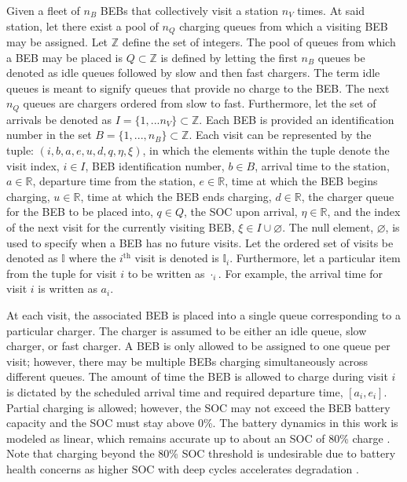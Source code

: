 \documentclass[energies,article,submit,moreauthors]{Definitions/mdpi}
\newcommand{\visit}{(i, b, a, e, u, d, q, \eta, \xi)}
\newcommand{\I}{\mathbb{I}}                 %
\newcommand{\Iset}{I}                       %
\newcommand{\Qset}{Q}                       %
\begin{document}
Given a fleet of \(n_B\) BEBs that collectively visit a station \(n_V\) times. At said station, let there exist a pool of
\(n_Q\) charging queues from which a visiting BEB may be assigned. Let \(\mathbb{Z}\) define the set of integers. The pool of queues
from which a BEB may be placed is \(\Qset \subset \mathbb{Z}\) is defined by letting the first \(n_B\) queues be denoted as idle queues
followed by slow and then fast chargers. The term idle queues is meant to signify queues that provide no charge to the
BEB. The next \(n_Q\) queues are chargers ordered from slow to fast. Furthermore, let the set of arrivals be denoted as
\(\Iset = \{ 1, ... n_V \} \subset \mathbb{Z}\). Each BEB is provided an identification number in the set \(B = \{ 1, ..., n_B \} \subset \mathbb{Z}\).
Each visit can be represented by the tuple: \(\visit\), in which the elements within the tuple denote the visit index, \(i
\in I\), BEB identification number, \(b \in B\), arrival time to the station, \(a \in \mathbb{R}\), departure time from the station, \(e \in
\mathbb{R}\), time at which the BEB begins charging, \(u \in \mathbb{R}\), time at which the BEB ends charging, \(d \in \mathbb{R}\), the charger queue for
the BEB to be placed into, \(q \in Q\), the SOC upon arrival, \(\eta \in \mathbb{R}\), and the index of the next visit for the currently
visiting BEB, \(\xi \in I \cup \varnothing\). The null element, \(\varnothing\), is used to specify when a BEB has no future
visits. Let the ordered set of visits be denoted as \(\I\) where the \(i^{\text{th}}\) visit is denoted is \(\I_i\).
Furthermore, let a particular item from the tuple for visit \(i\) to be written as \(\cdot_i\). For example, the arrival time
for visit \(i\) is written as \(a_i\).

At each visit, the associated BEB is placed into a single queue corresponding to a particular charger. The charger is
assumed to be either an idle queue, slow charger, or fast charger. A BEB is only allowed to be assigned to one queue per
visit; however, there may be multiple BEBs charging simultaneously across different queues. The amount of time the BEB
is allowed to charge during visit \(i\) is dictated by the scheduled arrival time and required departure time, \([a_i,
e_i]\). Partial charging is allowed; however, the SOC may not exceed the BEB battery capacity and the SOC must stay above
0\%. The battery dynamics in this work is modeled as linear, which remains accurate up to about an SOC of 80\% charge
\cite{liu-2020-batter-elect}. Note that charging beyond the 80\% SOC threshold is undesirable due to battery health
concerns as higher SOC with deep cycles accelerates degradation \cite{edge-2021-lithium,millner-2010-model-lithium}.
\end{document}
